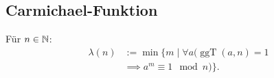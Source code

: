 \subsection{Carmichael-Funktion}
\begin{definition}\mbox{}\newline
Für $n\in\mathbb N$:
\begin{equation}
\begin{split}
\lambda(n) &:= \min\{m\mid \forall a(\operatorname{ggT}(a,n)=1\\
&\implies a^m\equiv 1\mod n)\}.
\end{split}
\end{equation}
\end{definition}

